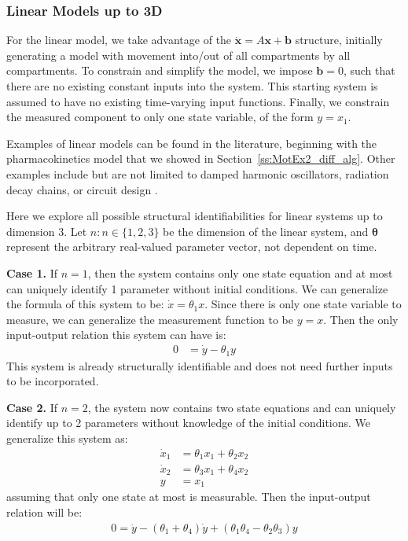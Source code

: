 \documentclass[a4paper,fleqn]{cas-dc}
\theoremstyle{definition}
\begin{document}
\subsubsection{Linear Models up to 3D} \label{ss:lin_appendix}

\noindent For the linear model, we take advantage of the $\dot{\pmb{x}} = A\pmb{x} + \pmb{b}$ structure, initially generating a model with movement into/out of all compartments by all compartments.
To constrain and simplify the model, we impose $\pmb{b} = 0$, such that there are no existing constant inputs into the system.
This starting system is assumed to have no existing time-varying input functions.
Finally, we constrain the measured component to only one state variable, of the form $y = x_1$.

Examples of linear models can be found in the literature, beginning with the pharmacokinetics model that we showed in Section~\ref{ss:MotEx2_diff_alg}. 
Other examples include but are not limited to damped harmonic oscillators, radiation decay chains, or circuit design \cite{belyshev2014studying, bauer2001transport,chandrasekar2007lagrangian, dekker1981classical, fu2021solving, bellen1999methods, lohfink2005linear}.

Here we explore all possible structural identifiabilities for linear systems up to dimension 3.
Let $n: n \in \{1,2,3\}$ be the dimension of the linear system, and $\pmb{\theta}$ represent the arbitrary real-valued parameter vector, not dependent on time.

\vspace{0.2cm}
\noindent \textbf{Case 1.} If $n=1$, then the system contains only one state equation and at most can uniquely identify 1 parameter without initial conditions.
We can generalize the formula of this system to be: $\dot{x} = \theta_1 x$.
Since there is only one state variable to measure, we can generalize the measurement function to be $y = x$.
Then the only input-output relation this system can have is:
\begin{align*}
    0 & = \dot{y} - \theta_1 y
\end{align*}
This system is already structurally identifiable and does not need further inputs to be incorporated.


\vspace{0.2cm}
\noindent \textbf{Case 2.} If $n=2$, the system now contains two state equations and can uniquely identify up to 2 parameters without knowledge of the initial conditions.
We generalize this system as:
\begin{align} \label{eq:2d_a_appendix}
    \dot{x}_1 &= \theta_1 x_1 + \theta_2 x_2 \\ \nonumber
    \dot{x}_2 &= \theta_3 x_1 + \theta_4 x_2 \\ \nonumber
    y &= x_1
\end{align}
assuming that only one state at most is measurable.
Then the input-output relation will be:
\begin{align}\label{eq:io_2d_appendix}
        0 = \ddot{y} - (\theta_1 + \theta_4) \dot{y} + (\theta_1 \theta_4 - \theta_2 \theta_3) y
\end{align}
\end{document}
